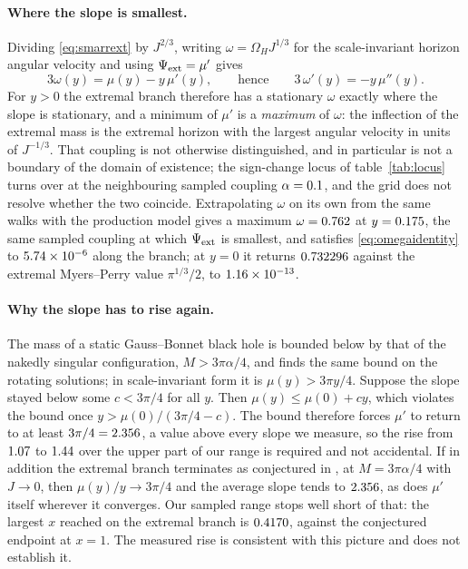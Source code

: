 \documentclass[11pt,a4paper]{article}
\begin{document}
\paragraph{Where the slope is smallest.}
Dividing \eqref{eq:smarrext} by $J^{2/3}$, writing $\omega=\Omega_HJ^{1/3}$ for
the scale-invariant horizon angular velocity and using
$\Psi_{\mathrm{ext}}=\mu'$ gives
\begin{equation}
 3\omega(y)=\mu(y)-y\,\mu'(y),
 \qquad\text{hence}\qquad
 3\,\omega'(y)=-y\,\mu''(y).
 \label{eq:omegaidentity}
\end{equation}
For $y>0$ the extremal branch therefore has a stationary $\omega$ exactly where
the slope is stationary, and a minimum of $\mu'$ is a \emph{maximum} of
$\omega$: the inflection of the extremal mass is the extremal horizon with the
largest angular velocity in units of $J^{-1/3}$. That coupling is not otherwise
distinguished, and in particular is not a boundary of the domain of existence;
the sign-change locus of table~\ref{tab:locus} turns over at the neighbouring
sampled coupling $\alpha=0.1$, and the grid does not resolve
whether the two coincide. Extrapolating $\omega$ on its own from the same walks
with the production model gives a maximum $\omega=0.762$ at
$y=0.175$, the same sampled coupling at which $\Psi_{\mathrm{ext}}$ is smallest,
and satisfies \eqref{eq:omegaidentity} to $5.74\times 10^{-6}$ along the branch; at
$y=0$ it returns $0.732296$ against the extremal Myers--Perry value
$\pi^{1/3}/2$, to $1.16\times 10^{-13}$.

\paragraph{Why the slope has to rise again.}
The mass of a static Gauss--Bonnet black hole is bounded below by that of the
nakedly singular configuration, $M>3\pi\alpha/4$, and \cite{Kleihaus:2023zzs}
finds the same bound on the rotating solutions; in scale-invariant form it is
$\mu(y)>3\pi y/4$. Suppose the slope stayed below some $c<3\pi/4$ for all $y$.
Then $\mu(y)\le\mu(0)+cy$, which violates the bound once
$y>\mu(0)/(3\pi/4-c)$. The bound therefore forces $\mu'$ to return to at least
$3\pi/4=2.356$, a value above every slope we measure, so the rise
from $1.07$ to $1.44$ over the upper part of our range is
required and not accidental. If in addition the extremal branch terminates as
conjectured in \cite{Kleihaus:2023zzs}, at $M=3\pi\alpha/4$ with $J\to0$, then
$\mu(y)/y\to3\pi/4$ and the average slope tends to $2.356$, as does
$\mu'$ itself wherever it converges. Our sampled range stops well short of
that: the largest $x$ reached on the extremal branch is $0.4170$, against
the conjectured endpoint at $x=1$. The measured rise is consistent with this
picture and does not establish it.
\end{document}
